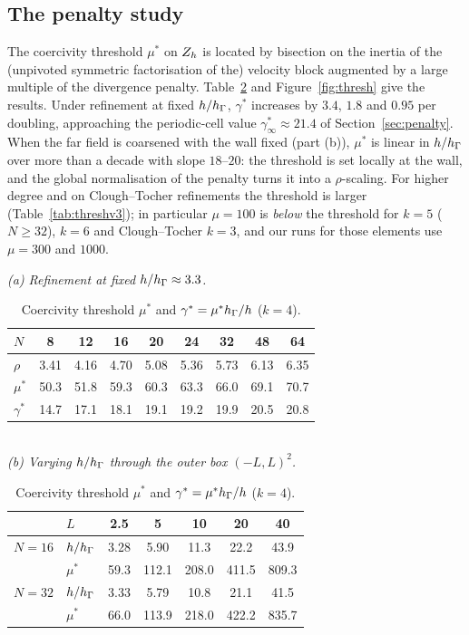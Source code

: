 \subsection{The penalty study}
The coercivity threshold $\mu^\ast$ on $Z_h$ is located by bisection on the inertia of the (unpivoted symmetric factorisation of the) velocity block augmented by a large multiple of the divergence penalty. Table~\ref{tab:thresh} and Figure~\ref{fig:thresh} give the results. Under refinement at fixed $h/h_\Gamma$, $\gamma^\ast$ increases by $3.4$, $1.8$ and $0.95$ per doubling, approaching the periodic-cell value $\gamma^\ast_\infty\approx21.4$ of Section~\ref{sec:penalty}. When the far field is coarsened with the wall fixed (part (b)), $\mu^\ast$ is linear in $h/h_\Gamma$ over more than a decade with slope $18$--$20$: the threshold is set locally at the wall, and the global normalisation of the penalty turns it into a $\rho$-scaling. For higher degree and on Clough--Tocher refinements the threshold is larger (Table~\ref{tab:threshv3}); in particular $\mu=100$ is \emph{below} the threshold for $k=5$ ($N\ge32$), $k=6$ and Clough--Tocher $k=3$, and our runs for those elements use $\mu=300$ and $1000$.

\begin{table}[t]
\centering\small
\caption{Coercivity threshold $\mu^\ast$ and $\gamma^\ast=\mu^\ast h_\Gamma/h$ ($k=4$).}\label{tab:thresh}
\textit{(a) Refinement at fixed $h/h_\Gamma\approx3.3$.}\\[2pt]
\begin{tabular}{lcccccccc}
\toprule
$N$ & 8 & 12 & 16 & 20 & 24 & 32 & 48 & 64\\
\midrule
$\rho$ & 3.41 & 4.16 & 4.70 & 5.08 & 5.36 & 5.73 & 6.13 & 6.35\\
$\mu^\ast$ & 50.3 & 51.8 & 59.3 & 60.3 & 63.3 & 66.0 & 69.1 & 70.7\\
$\gamma^\ast$ & 14.7 & 17.1 & 18.1 & 19.1 & 19.2 & 19.9 & 20.5 & 20.8\\
\bottomrule
\end{tabular}\\[6pt]
\textit{(b) Varying $h/h_\Gamma$ through the outer box $(-L,L)^2$.}\\[2pt]
\begin{tabular}{llccccc}
\toprule
 & $L$ & 2.5 & 5 & 10 & 20 & 40\\
\midrule
$N=16$ & $h/h_\Gamma$ & 3.28 & 5.90 & 11.3 & 22.2 & 43.9\\
 & $\mu^\ast$ & 59.3 & 112.1 & 208.0 & 411.5 & 809.3\\
\midrule
$N=32$ & $h/h_\Gamma$ & 3.33 & 5.79 & 10.8 & 21.1 & 41.5\\
 & $\mu^\ast$ & 66.0 & 113.9 & 218.0 & 422.2 & 835.7\\
\bottomrule
\end{tabular}
\end{table}

